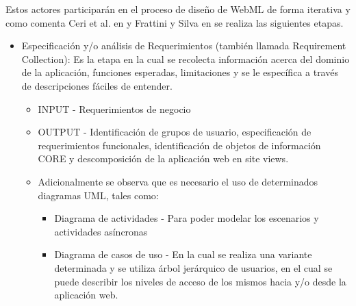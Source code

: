 \documentclass[oneside,12pt,a4paper]{memoir}%
\begin{document}
\begin{itemize}
		Estos actores participar\'an en el proceso de dise\~no de \ac{WebML} de forma
		iterativa y como comenta Ceri et al. en \cite{Matera2003} y Frattini y Silva
		en \cite{Frattini2007} se realiza las siguientes etapas.
		
		\begin{itemize}
		  \item Especificaci\'on y/o an\'alisis de Requerimientos (tambi\'en llamada
		  Requirement Collection): Es la etapa en la cual se recolecta informaci\'on
		  acerca del dominio de la aplicaci\'on, funciones esperadas, limitaciones y se
		  le espec\'ifica a trav\'es de descripciones f\'aciles de entender.
			\begin{itemize}
			  \item INPUT - Requerimientos de negocio
			  \item OUTPUT - Identificaci\'on de grupos de usuario, especificaci\'on de
			  requerimientos funcionales, identificaci\'on de objetos de informaci\'on CORE y
			  descomposici\'on de la aplicaci\'on web en site views.
			  \item Adicionalmente se observa que es necesario el uso de determinados
			  diagramas \ac{UML}, tales como:
	
			  \begin{itemize}
			    \item Diagrama de actividades - Para poder modelar los escenarios
			    y actividades as\'incronas
			    \item Diagrama de casos de uso - En la cual se realiza una variante
			    determinada y se utiliza \'arbol jer\'arquico de usuarios, en el cual se
			    puede describir los niveles de acceso de los mismos hacia y/o desde la
			    aplicaci\'on web.
			    \end{itemize}
	
			\end{itemize}
		  

\end{itemize}
\end{itemize}
\end{document}
